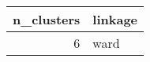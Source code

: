 \begin{tabular}{rl}
\toprule
n_clusters & linkage \\
\midrule
6 & ward \\
\bottomrule
\end{tabular}
